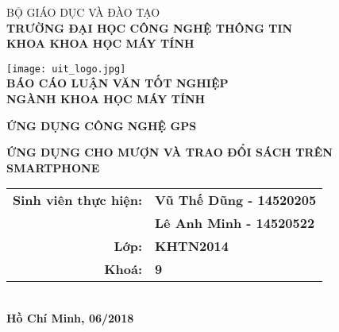 \documentclass[../thesis.tex]{subfiles}
\begin{document}
\begin{titlepage}

\begin{center}

BỘ GIÁO DỤC VÀ ĐÀO TẠO\\
\textbf{TRƯỜNG ĐẠI HỌC CÔNG NGHỆ THÔNG TIN\\}
\textbf{KHOA KHOA HỌC MÁY TÍNH\\[1cm]}

\texttt{[image: uit\_logo.jpg]}\\[1cm]

\textbf{BÁO CÁO LUẬN VĂN TỐT NGHIỆP\\}
\textbf{NGÀNH KHOA HỌC MÁY TÍNH\\[2cm]}

\begin{large}
\textbf{ỨNG DỤNG CÔNG NGHỆ GPS\\[0.5cm]}
\end{large}
\textbf{{\LARGE ỨNG DỤNG CHO MƯỢN VÀ TRAO ĐỔI SÁCH TRÊN SMARTPHONE}}
\\[2cm]

\begin{tabular}{ r l }
\textbf{Sinh viên thực hiện:} & \textbf{Vũ Thế Dũng - 14520205}\\ 
\textbf{} & \textbf{Lê Anh Minh - 14520522}\\
\textbf{Lớp:} & \textbf{KHTN2014}\\
\textbf{Khoá:} & \textbf{9}   
\end{tabular}
\\[4cm]

\textbf{Hồ Chí Minh, 06/2018}

\end{center}

\end{titlepage}
\end{document}
